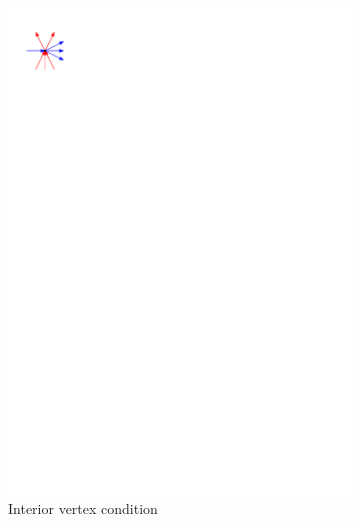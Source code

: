   \begin{figure}
      \centering
      \begin{subfigure}[b]{0.2 \textwidth}
          \includegraphics[width = \textwidth]{rectangularDuals/img/interiorcondition.pdf}
          \caption{Interior vertex condition}
      \end{subfigure}
      ~
      \begin{subfigure}[b]{0.7 \textwidth}

\end{subfigure}
\end{figure}
